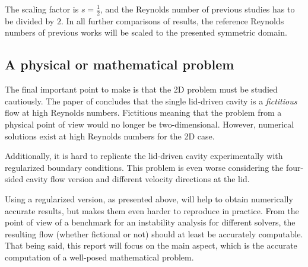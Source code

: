 The scaling factor is $s=\frac{1}{2}$, and the Reynolds number of previous
studies has to be divided by $2$. In all further comparisons of results, the
reference Reynolds numbers of previous works will be scaled to the presented
symmetric domain.


\subsection{A physical or mathematical problem}

The final important point to make is that the 2D problem must be studied cautiously.
The paper of \cite{eturk2009} concludes that the single lid-driven cavity is a
\emph{fictitious} flow at high Reynolds numbers. Fictitious meaning that the problem
from a physical point of view would no longer be two-dimensional. However,
numerical solutions exist at high Reynolds numbers for the 2D case. 

Additionally, it is hard to replicate the lid-driven cavity experimentally with
regularized boundary conditions. This problem is even worse considering the
four-sided cavity flow version and different velocity directions at the lid.

Using a regularized version, as presented above, will help to obtain numerically
accurate results, but makes them even harder to reproduce in practice.
From the point of view of a benchmark for an instability analysis for different
solvers, the resulting flow (whether fictional or not) should at least be accurately
computable. That being said, this report will focus on the main aspect, which
is the accurate computation of a well-posed mathematical problem. 
